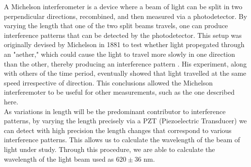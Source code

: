 A Michelson interferometer is a device where a beam of light can be split in two perpendicular directions, recombined, and then measured via a photodetector. By varying the length that one of the two split beams travels, one can produce interference patterns that can be detected by the photodetector. This setup was originally devised by Michelson in 1881 to test whether light propegated through an "aether," which could cause the light to travel more slowly in one direction than the other, thereby producing an interference pattern \cite{michelson}. His experiment, along with others of the time period, eventually showed that light travelled at the same speed irrespective of direction. This conclusions allowed the Michelson interferemoter to be useful for other measurements, such as the one described here.
  \\
  As variations in length will be the predominant contributor to interference patterns, by varying the length precisely via a PZT (Piezoelectric Transducer) we can detect with high precision the length changes that correspond to various interference patterns. This allows us to calculate the wavelength of the beam of light under study. Through this procedure, we are able to calculate the wavelength of the light beam used as $620 \pm 36$ nm.
  \\
